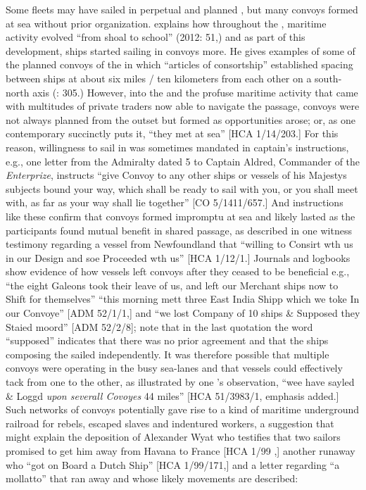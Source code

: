 Some fleets may have sailed in perpetual and planned , but many convoys formed at sea without prior organization. \citeauthor{Bicheno2012} explains how throughout the , maritime activity evolved “from shoal to school” (2012: 51,) and as part of this development, ships started sailing in convoys more. He gives examples of some of the planned convoys of the  in which “articles of consortship” established spacing between ships at about six miles / ten kilometers from each other on a south-north axis (\citealt{Bicheno2012}: 305.) However, into the  and the profuse maritime activity that came with multitudes of private traders now able to navigate the  passage, convoys were not always planned from the outset but formed as opportunities arose; or, as one contemporary succinctly puts it, “they met at sea” [HCA 1/14/203.] For this reason, willingness to sail in  was sometimes mandated in captain’s instructions, e.g., one letter from the Admiralty dated 5 \citealt{December1699} to Captain Aldred, Commander of the \textit{ Enterprize}, instructs “give Convoy to any other ships or vessels of his Majestys subjects bound your way, which shall be ready to sail with you, or you shall meet with, as far as your way shall lie together” [CO 5/1411/657.] And instructions like these confirm that convoys formed impromptu at sea and likely lasted as the participants found mutual benefit in shared passage, as described in one witness testimony regarding a vessel from Newfoundland that “willing to Consirt wth us in our Design and soe Proceeded wth us” [HCA 1/12/1.] Journals and logbooks show evidence of how vessels left convoys after they ceased to be beneficial e.g., “the eight Galeons took their leave of us, and left our Merchant ships now to Shift for themselves” \citep[15,]{Gage1648} “this morning mett three East India Shipp which we toke In our Convoye” [ADM 52/1/1,] and “we lost Company of 10 ships \& Supposed they Staied moord” [ADM 52/2/8]; note that in the last quotation the word “supposed” indicates that there was no prior agreement and that the ships composing the  sailed independently. It was therefore possible that multiple convoys were operating in the busy sea-lanes and that vessels could effectively tack from one to the other, as illustrated by one ’s observation, “wee have sayled \& Loggd \textit{upon severall Covoyes} 44 miles” [HCA 51/3983/1, emphasis added.]  Such networks of convoys potentially gave rise to a kind of maritime underground railroad for rebels, escaped slaves and indentured workers, a suggestion that might explain the deposition of Alexander Wyat who testifies that two sailors promised to get him away from Havana to France [HCA 1/99  \citealt{Islands1722},] another runaway who “got on Board a Dutch Ship” [HCA 1/99/171,] and a letter regarding “a mollatto” that ran away and whose likely movements are described:


